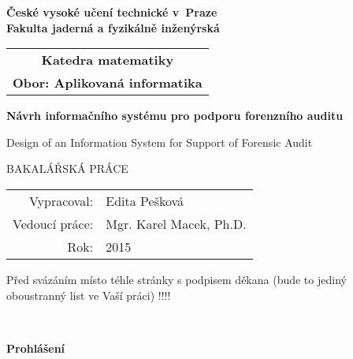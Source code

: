 \documentclass[a4paper,12pt]{report}
\newcommand{\cvut}{České vysoké učení technické v~Praze}
\newcommand{\fjfi}{Fakulta jaderná a fyzikálně inženýrská}
\newcommand{\kse}{Katedra matematiky}
\newcommand{\obor}{Aplikovaná informatika}
\newcommand{\zamereni}{}
\newcommand{\nazevcz}{Návrh informačního systému pro podporu forenzního auditu}        %
\newcommand{\nazeven}{Design of an Information System for Support of Forensic Audit}     %
\newcommand{\autor}{Edita Pešková}           %
\newcommand{\rok}{2015}                %
\newcommand{\vedouci}{Mgr. Karel Macek, Ph.D.}         %
\begin{document}
\thispagestyle{empty}

\begin{center}
    {\Large \bf \cvut\\[2mm] \fjfi }
    \vspace{10mm}

    \begin{tabular}{c}
    {\bf \kse}\\
    {\bf Obor: \obor}\\
    \end{tabular}

   \vspace{10mm} \epsfysize=25mm  \vspace{15mm}
   \vspace{50mm}

   {\Huge \bf \nazevcz \par \nazeven\par}

   \vspace{15mm}
   {\Large BAKALÁŘSKÁ PRÁCE}

   \vfill
   {\large
    \begin{tabular}{rl}
    Vypracoval: & \autor\\
    Vedoucí práce: & \vedouci\\
    Rok: & \rok
    \end{tabular}
   }
\end{center}



\newpage  %
\thispagestyle{empty} Před svázáním místo téhle stránky  s podpisem
děkana (bude to jediný oboustranný list ve Vaší práci) !!!!



\newpage %
\thispagestyle{empty}  %

~ %
\vfill %

{\bf Prohlášení} %
\end{document}
